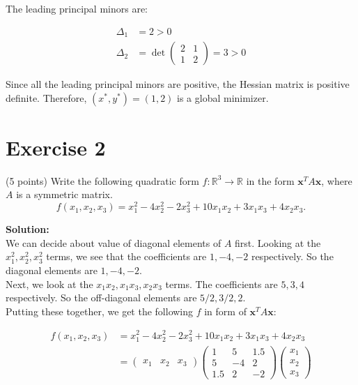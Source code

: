 \documentclass{article}
\begin{document}
The leading principal minors are:

\begin{align*}
    \Delta_1 &= 2 > 0 \\
    \Delta_2 &= \det\begin{pmatrix}
        2 & 1 \\
        1 & 2
    \end{pmatrix} = 3 > 0
\end{align*}

Since all the leading principal minors are positive, the Hessian matrix is positive definite. Therefore, $(x^*,y^*) = (1,2)$ is a global minimizer.

\newpage

\section*{Exercise 2}
(5 points) Write the following quadratic form $f: \mathbb{R}^3 \to \mathbb{R}$ in the form $\mathbf{x}^T A\mathbf{x}$, where $A$ is a symmetric matrix.
$$f(x_1,x_2,x_3) = x_1^2 - 4x_2^2 - 2x_3^2 + 10x_1x_2 + 3x_1x_3 + 4x_2x_3.$$

\textbf{Solution:} \\

We can decide about value of diagonal elements of $A$ first. Looking at the $x_1^2, x_2^2, x_3^2$ terms, we see that the coefficients are $1, -4, -2$ respectively. So the diagonal elements are $1, -4, -2$. \\

Next, we look at the $x_1x_2, x_1x_3, x_2x_3$ terms. The coefficients are $5, 3, 4$ respectively. So the off-diagonal elements are $5/2, 3/2, 2$. \\

Putting these together, we get the following $f$ in form of $\mathbf{x}^T A\mathbf{x}$:

\begin{align*}
    f(x_1,x_2,x_3) &= x_1^2 - 4x_2^2 - 2x_3^2 + 10x_1x_2 + 3x_1x_3 + 4x_2x_3 \\
    &= \begin{pmatrix}
        x_1 & x_2 & x_3
    \end{pmatrix}
    \begin{pmatrix}
        1 & 5 & 1.5 \\
        5 & -4 & 2 \\
        1.5 & 2 & -2
    \end{pmatrix}
    \begin{pmatrix}
        x_1 \\
        x_2 \\
        x_3
    \end{pmatrix}
\end{align*}
\newpage
\end{document}
